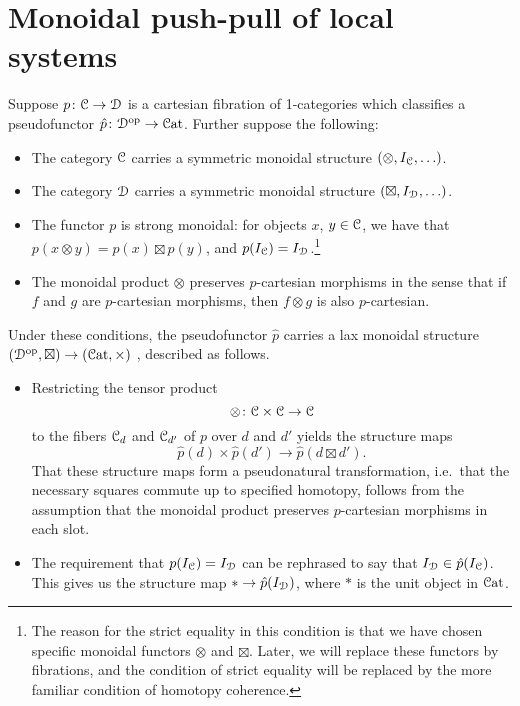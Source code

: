 \documentclass[main.tex]{subfiles}
\begin{document}
\section{Monoidal push-pull of local systems}
\label{sec:the_monoidal_construction}

Suppose $p\colon \mathcal{C} \to \mathcal{D}$ is a cartesian fibration of 1-categories which classifies a pseudofunctor $\hat{p}\colon \mathcal{D}^{\mathrm{op}} \to \mathcal{C}\mathrm{at}$. Further suppose the following:
\begin{itemize}
  \item The category $\mathcal{C}$ carries a symmetric monoidal structure $(\otimes, I_{\mathcal{C}}, \ldots)$.

  \item The category $\mathcal{D}$ carries a symmetric monoidal structure $(\boxtimes, I_{\mathcal{D}}, \ldots)$.

  \item The functor $p$ is strong monoidal: for objects $x$, $y \in \mathcal{C}$, we have that $p(x \otimes y) = p(x) \boxtimes p(y)$, and $p(I_{\mathcal{C}}) = I_{\mathcal{D}}$.\footnote{The reason for the strict equality in this condition is that we have chosen specific monoidal functors $\otimes$ and $\boxtimes$. Later, we will replace these functors by fibrations, and the condition of strict equality will be replaced by the more familiar condition of homotopy coherence.}

  \item The monoidal product $\otimes$ preserves $p$-cartesian morphisms in the sense that if $f$ and $g$ are $p$-cartesian morphisms, then $f \otimes g$ is also $p$-cartesian.
\end{itemize}
Under these conditions, the pseudofunctor $\hat{p}$ carries a lax monoidal structure $(\mathcal{D}^{\mathrm{op}}, \boxtimes) \to (\mathcal{C}\mathrm{at}, \times)$ \cite{moeller2018monoidal}, described as follows. 
\begin{itemize}
  \item Restricting the tensor product
    \begin{equation*}
      \otimes\colon \mathcal{C} \times \mathcal{C} \to \mathcal{C}
    \end{equation*}
    to the fibers $\mathcal{C}_{d}$ and $\mathcal{C}_{d'}$ of $p$ over $d$ and $d'$ yields the structure maps
    \begin{equation*}
      \hat{p}(d) \times \hat{p}(d') \to \hat{p}(d \boxtimes d').
    \end{equation*}
    That these structure maps form a pseudonatural transformation, i.e.\ that the necessary squares commute up to specified homotopy, follows from the assumption that the monoidal product preserves $p$-cartesian morphisms in each slot.

  \item The requirement that $p(I_{\mathcal{C}}) = I_{\mathcal{D}}$ can be rephrased to say that $I_{\mathcal{D}} \in \hat{p}(I_{\mathcal{C}})$. This gives us the structure map $\ast \to \hat{p}(I_{\mathcal{D}})$, where $\ast$ is the unit object in $\mathcal{C}\mathrm{at}$.
\end{itemize}
\end{document}
